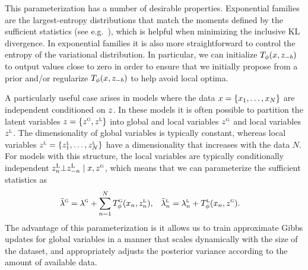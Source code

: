 \documentclass{article}
\theoremstyle{definition}
\begin{document}
This parameterization has a number of desirable properties. Exponential families are the largest-entropy distributions that match the moments defined by the sufficient statistics (see e.g.~\cite{wainwright2008graphical}), which is helpful when minimizing the inclusive KL divergence. In exponential families it is also more straightforward to control the entropy of the variational distribution. In particular, we can initialize $T_\phi(x, z_{-b})$ to output values close to zero in order to ensure that we initially propose from a prior and/or regularize $T_\phi(x, z_{-b})$ to help avoid local optima.

A particularly useful case arises in models where the data $x = \{x_1, \ldots, x_N\}$ are independent conditioned on $z$. In these models it is often possible to partition the latent variables $z = \{z^\textsc{g}, z^\textsc{l}\}$ into global and local variables $z^{\textsc{g}}$ and local variables $z^{\textsc{l}}$. The dimensionality of global variables is typically constant, whereas local variables $z^\textsc{l} = \{z^\textsc{l}_1, \ldots, z^\textsc{l}_N\}$ have a dimensionality that increases with the data $N$. For models with this structure, the local variables are typically conditionally independent $z^\textsc{L}_n \bot z^\textsc{L}_{-n} \mid x, z^\textsc{g}$, which means that we can parameterize the sufficient statistics as
\begin{align*}
    \tilde{\lambda}^\textsc{g}
    &= 
    \lambda^\textsc{g} 
    + 
    \sum_{n=1}^N 
    T^\textsc{g}_\phi(x_n, z^\textsc{l}_{n}),
    &
    \tilde{\lambda}^\textsc{l}_n
    &=
    \lambda^\textsc{l}_n + T^\textsc{l}_\phi(x_n, z^\textsc{g}).
\end{align*}
The advantage of this parameterization is it allows us to train approximate Gibbs updates for global variables in a manner that scales dynamically with the size of the dataset, and appropriately adjusts the posterior variance according to the amount of available data.
\end{document}
